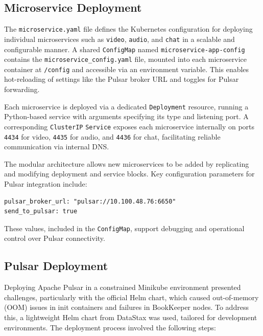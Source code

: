 \subsection{Microservice Deployment}
The \texttt{microservice.yaml} file defines the Kubernetes configuration for deploying individual microservices such as \texttt{video}, \texttt{audio}, and \texttt{chat} in a scalable and configurable manner. A shared \texttt{ConfigMap} named \texttt{microservice-app-config} contains the \texttt{microservice\_config.yaml} file, mounted into each microservice container at \texttt{/config} and accessible via an environment variable. This enables hot-reloading of settings like the Pulsar broker URL and toggles for Pulsar forwarding.

Each microservice is deployed via a dedicated \texttt{Deployment} resource, running a Python-based service with arguments specifying its type and listening port. A corresponding \texttt{ClusterIP} \texttt{Service} exposes each microservice internally on ports \texttt{4434} for video, \texttt{4435} for audio, and \texttt{4436} for chat, facilitating reliable communication via internal DNS.

The modular architecture allows new microservices to be added by replicating and modifying deployment and service blocks. Key configuration parameters for Pulsar integration include:

\begin{lstlisting}[breaklines=true,basicstyle=\small\ttfamily,frame=single]
pulsar_broker_url: "pulsar://10.100.48.76:6650"
send_to_pulsar: true
\end{lstlisting}

These values, included in the \texttt{ConfigMap}, support debugging and operational control over Pulsar connectivity.

\subsection{Pulsar Deployment}
Deploying Apache Pulsar in a constrained Minikube environment presented challenges, particularly with the official Helm chart, which caused out-of-memory (OOM) issues in init containers and failures in BookKeeper nodes. To address this, a lightweight Helm chart from DataStax was used, tailored for development environments. The deployment process involved the following steps:

